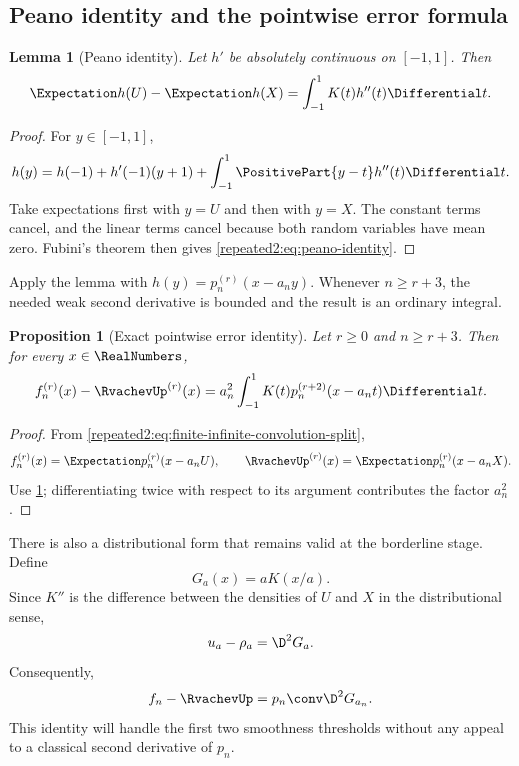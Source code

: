 \documentclass[11pt,oneside]{article}
\newtheorem{proposition}[proposition]{Proposition}
\newtheorem{lemma}[lemma]{Lemma}
\theoremstyle{definition}
\theoremstyle{remark}
\begin{document}
\subsection{Peano identity and the pointwise error formula}

\begin{lemma}[Peano identity]
\label{repeated2:lem:peano-identity}
Let $h'$ be absolutely continuous on $[-1,1]$.  Then
\begin{equation}
 \Expectation h(U)-\Expectation h(X)=\int_{-1}^{1}K(t)h''(t)\Differential t.
 \label{repeated2:eq:peano-identity}
\end{equation}
\end{lemma}

\begin{proof}
For $y\in[-1,1]$,
\[
 h(y)=h(-1)+h'(-1)(y+1)+\int_{-1}^{1}\PositivePart{y-t}h''(t)\Differential t.
\]
Take expectations first with $y=U$ and then with $y=X$.  The constant terms cancel, and
the linear terms cancel because both random variables have mean zero.  Fubini's theorem
then gives \eqref{repeated2:eq:peano-identity}.
\end{proof}

Apply the lemma with $h(y)=p_n^{(r)}(x-a_ny)$.  Whenever $n\ge r+3$, the needed weak
second derivative is bounded and the result is an ordinary integral.

\begin{proposition}[Exact pointwise error identity]
\label{repeated2:prop:pointwise-error}
Let $r\ge0$ and $n\ge r+3$.  Then for every $x\in\RealNumbers$,
\begin{equation}
 f_n^{(r)}(x)-\RvachevUp^{(r)}(x)
 =a_n^2\int_{-1}^{1}K(t)
 p_n^{(r+2)}(x-a_nt)\Differential t.
 \label{repeated2:eq:exact-pointwise-error}
\end{equation}
\end{proposition}

\begin{proof}
From \eqref{repeated2:eq:finite-infinite-convolution-split},
\[
 f_n^{(r)}(x)=\Expectation p_n^{(r)}(x-a_nU),
 \qquad
 \RvachevUp^{(r)}(x)=\Expectation p_n^{(r)}(x-a_nX).
\]
Use \cref{repeated2:lem:peano-identity}; differentiating twice with respect to its argument contributes
the factor $a_n^2$.
\end{proof}

There is also a distributional form that remains valid at the borderline stage.  Define
\begin{equation}
 G_a(x)=aK(x/a).
 \label{repeated2:eq:Ga-definition}
\end{equation}
Since $K''$ is the difference between the densities of $U$ and $X$ in the distributional
sense,
\begin{equation}
 u_a-\rho_a=\D^2G_a.
 \label{repeated2:eq:kernel-distribution-identity}
\end{equation}
Consequently,
\begin{equation}
 f_n-\RvachevUp=p_n\conv\D^2G_{a_n}.
 \label{repeated2:eq:error-distribution-convolution}
\end{equation}
This identity will handle the first two smoothness thresholds without any appeal to a
classical second derivative of $p_n$.
\end{document}

